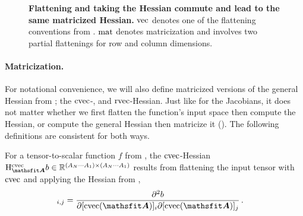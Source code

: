 \switchcolumn[1]
\begin{figure}[!h]
  \centering
  \caption{\textbf{Flattening and taking the Hessian commute and lead to the same matricized Hessian.}
    $\vec$ denotes one of the flattening conventions from .
    $\mat$ denotes matricization and involves two partial flattenings for row and column dimensions.}\label{fig:commutative-diagram-hessian}
\end{figure}
\switchcolumn[0]

\paragraph{Matricization.} For notational convenience, we will also define matricized versions of the general Hessian from ; the $\cvec$-, and $\rvec$-Hessian. Just like for the Jacobians, it does not matter whether we first flatten the function's input space then compute the Hessian, or compute the general Hessian then matricize it ().
The following definitions are consistent for both ways.

\switchcolumn[1]
\switchcolumn[0]

\begin{definition}\label{def:cvec_hessian}
  For a tensor-to-scalar function $f$ from , the $\cvec$-Hessian $\hess_{\tA}^{\cvec}b \in \sR^{(A_N \cdots A_1) \times (A_N \cdots A_1)}$ results from flattening the input tensor with $\cvec$ and applying the Hessian from ,
  \begin{align*}
    [\hess^{\cvec}_{\tA}b]_{i, j}
     & =
    \frac{\partial^2 b}{\partial [\cvec(\tA)]_{i} \partial [\cvec(\tA)]_{j}}\,.
  \end{align*}
\end{definition}

